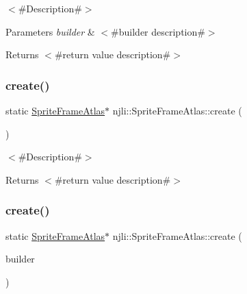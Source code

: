 $<$\#\+Description\#$>$


\begin{DoxyParams}{Parameters}
{\em builder} & $<$\#builder description\#$>$\\
\hline
\end{DoxyParams}
\begin{DoxyReturn}{Returns}
$<$\#return value description\#$>$ 
\end{DoxyReturn}
\mbox{\label{classnjli_1_1_sprite_frame_atlas_a898fa8f023efd9cbe6c0e7f4fd6a4215}} 
\subsubsection{\texorpdfstring{create()}{create()}\hspace{0.1cm}{\footnotesize\ttfamily [2/3]}}
{\footnotesize\ttfamily static \mbox{\hyperlink{classnjli_1_1_sprite_frame_atlas}{Sprite\+Frame\+Atlas}}$\ast$ njli\+::\+Sprite\+Frame\+Atlas\+::create (\begin{DoxyParamCaption}{ }\end{DoxyParamCaption})\hspace{0.3cm}{\ttfamily [static]}}

$<$\#\+Description\#$>$

\begin{DoxyReturn}{Returns}
$<$\#return value description\#$>$ 
\end{DoxyReturn}
\mbox{\label{classnjli_1_1_sprite_frame_atlas_a93ad01950173257f50571aafa6c5e502}} 
\subsubsection{\texorpdfstring{create()}{create()}\hspace{0.1cm}{\footnotesize\ttfamily [3/3]}}
{\footnotesize\ttfamily static \mbox{\hyperlink{classnjli_1_1_sprite_frame_atlas}{Sprite\+Frame\+Atlas}}$\ast$ njli\+::\+Sprite\+Frame\+Atlas\+::create (\begin{DoxyParamCaption}\item[{const \mbox{\hyperlink{classnjli_1_1_sprite_frame_atlas_builder}{Sprite\+Frame\+Atlas\+Builder}} \&}]{builder }\end{DoxyParamCaption})\hspace{0.3cm}{\ttfamily [static]}}

